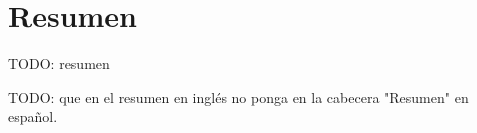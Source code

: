 \chapter*{Resumen}

TODO: resumen

TODO: que en el resumen en inglés no ponga en la cabecera "Resumen" en español.